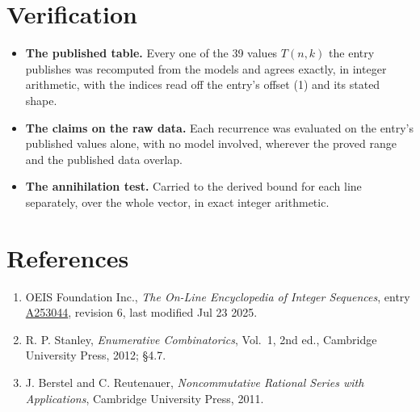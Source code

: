 \documentclass[11pt]{article}
\theoremstyle{definition}
\begin{document}
\section{Verification}

\begin{itemize}

\item {\bfseries The published table.} Every one of the 39 values $T(n,k)$ the entry publishes was recomputed from the models and agrees exactly, in integer arithmetic, with the indices read off the entry's offset (1) and its stated shape.

\item {\bfseries The claims on the raw data.} Each recurrence was evaluated on the entry's published values alone, with no model involved, wherever the proved range and the published data overlap.

\item {\bfseries The annihilation test.} Carried to the derived bound for each line separately, over the whole vector, in exact integer arithmetic.

\end{itemize}

\section{References}

\begin{enumerate}

\item OEIS Foundation Inc., \emph{The On-Line Encyclopedia of Integer Sequences}, entry \href{https://oeis.org/A253044}{A253044}, revision 6, last modified Jul 23 2025.

\item R. P. Stanley, \emph{Enumerative Combinatorics}, Vol.~1, 2nd ed., Cambridge University Press, 2012; \S4.7.

\item J. Berstel and C. Reutenauer, \emph{Noncommutative Rational Series with Applications}, Cambridge University Press, 2011.

\end{enumerate}
\end{document}
